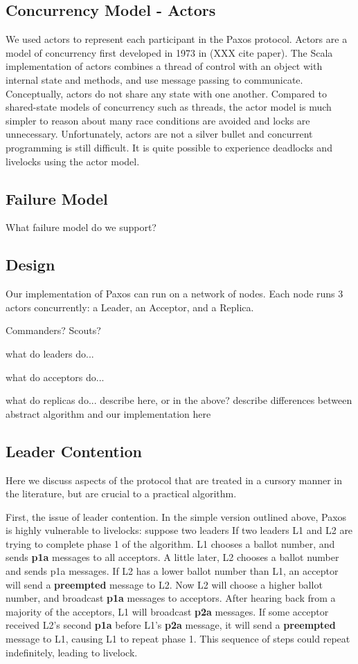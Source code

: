 \documentclass{sig-alternate}
\begin{document}
\subsection{Concurrency Model - Actors}
We used actors to represent each participant in the Paxos protocol. Actors are a model of concurrency first developed in 1973 in (XXX cite paper). The Scala implementation of actors combines a thread of control with an object with internal state and methods, and use message passing to communicate. Conceptually, actors do not share any state with one another. Compared to shared-state models of concurrency such as threads, the actor model is much simpler to reason about many race conditions are avoided and locks are unnecessary. Unfortunately, actors are not a silver bullet and concurrent programming is still difficult. It is quite possible to experience deadlocks and livelocks using the actor model.

\subsection{Failure Model}
What failure model do we support?

\subsection{Design}
Our implementation of Paxos can run on a network of nodes. Each node runs 3 actors concurrently: a Leader, an Acceptor, and a Replica. 

Commanders? Scouts?

what do leaders do...

what do acceptors do...

what do replicas do...
describe here, or in the above?
describe differences between abstract algorithm and our implementation here

\subsection{Leader Contention}

Here we discuss aspects of the protocol that are treated in a cursory manner in the literature, but are crucial to a practical algorithm.

First, the issue of leader contention. In the simple version outlined above, Paxos is highly vulnerable to livelocks: suppose two leaders If two leaders L1 and L2 are trying to complete phase 1 of the algorithm. L1 chooses a ballot number, and sends \textbf{p1a} messages to all acceptors. A little later, L2 chooses a ballot number and sends p1a messages. If L2 has a lower ballot number than L1, an acceptor will send a \textbf{preempted} message to L2. Now L2 will choose a higher ballot number, and broadcast \textbf{p1a} messages to acceptors. After hearing back from a majority of the acceptors, L1 will broadcast \textbf{p2a} messages. If some acceptor received L2's second \textbf{p1a} before L1's \textbf{p2a} message, it will send a \textbf{preempted} message to L1, causing L1 to repeat phase 1. This sequence of steps could repeat indefinitely, leading to livelock.
\end{document}
